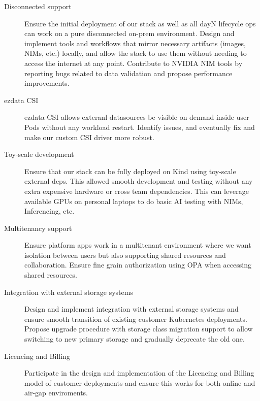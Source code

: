 \documentclass[margin,centered]{res}
\begin{document}
\begin{resume}
\begin{description}
\item[Disconnected support]
Ensure the initial deployment of our stack as well as all dayN lifecycle ops
can work on a pure disconnected on-prem environment. Design and implement tools
and workflows that mirror necessary artifacts (images, NIMs, etc.) locally, and
allow the stack to use them without needing to access the internet at any point.
Contribute to NVIDIA NIM tools by reporting bugs related to data validation and
propose performance improvements.
\end{description}

\begin{description}
\item[ezdata CSI]
ezdata CSI allows exteranl datasources be visible on demand inside user Pods
without any workload restart. Identify issues, and eventually fix and make our
custom CSI driver more robust.
\end{description}

\begin{description}
\item[Toy-scale development]
Ensure that our stack can be fully deployed on Kind using toy-scale external
deps. This allowed smooth development and testing without any extra expensive
hardware or cross team dependencies. This can leverage available GPUs on
personal laptops to do basic AI testing with NIMs, Inferencing, etc.
\end{description}

\begin{description}
\item[Multitenancy support]
Ensure platform apps work in a multitenant environment where we want isolation
between users but also supporting shared resources and collaboration. Ensure fine
grain authorization using OPA when accessing shared resources.
\end{description}

\begin{description}
\item[Integration with external storage systems]
Design and implement integration with external storage systems and ensure smooth
transition of existing customer Kubernetes deployments. Propose upgrade procedure
with storage class migration support to allow switching to new primary storage
and gradually deprecate the old one.
\end{description}

\begin{description}
\item[Licencing and Billing]
Participate in the design and implementation of the Licencing and Billing model
of customer deployments and ensure this works for both online and air-gap enviroments.
\end{description}


\end{resume}
\end{document}
